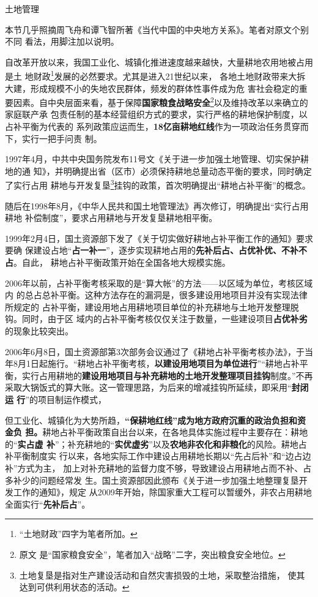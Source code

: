 土地管理

本节几乎照摘周飞舟和谭飞智所著《当代中国的中央地方关系》。笔者对原文个别不同
看法，用脚注加以说明。

自改革开放以来，我国工业化、城镇化推进速度越来越快，大量耕地农用地被占用是土
地财政\footnote{“土地财政”四字为笔者所加。}发展的必然要求。尤其是进入21世纪以来，
各地土地财政带来大拆大建，形成规模不小的失地农民群体，频发的群体性事件成为危
害社会稳定的重要因素。自中央层面来看，基于保障\textbf{国家粮食战略安全}\footnote{原文
  是“国家粮食安全”，笔者加入“战略”二字，突出粮食安全地位。}以及维持改革以来确立的家庭联产承
包责任制的基本经营组织方式的要求，实行严格的耕地保护制度，以占补平衡为代表的
系列政策应运而生，\textbf{18亿亩耕地红线}作为一项政治任务贯穿而下，实行一把手问责
制。

1997年4月，中共中央国务院发布11号文《关于进一步加强土地管理、切实保护耕地的通
知》，并明确提出省（区市）必须保持耕地总量动态平衡的要求，同时确定了实行占用
耕地与开发复垦\footnote{土地复垦是指对生产建设活动和自然灾害损毁的土地，采取整治措施，
  使其达到可供利用状态的活动。}挂钩的政策，首次明确提出“耕地占补平衡”的概念。

随后在1998年8月，《中华人民共和国土地管理法》再次修订，明确提出“实行占用耕地
补偿制度”，要求占用耕地与开发复垦耕地相平衡。

1999年2月4日，国土资源部下发了《关于切实做好耕地占补平衡工作的通知》要求要确
保建设占地“\textbf{占一补一}”，逐步实现耕地占用的\textbf{先补后占、占优补优、不补不占}。自此，
耕地占补平衡政策开始在全国各地大规模实施。

2006年以前，占补平衡考核采取的是“算大帐”的方法——以区域为单位，考核区域内
的总占总补平衡。这种方法存在的漏洞是，很多建设用地项目并没有实现法律所规定的
占补平衡，建设用地占用耕地项目单位的补充耕地与土地开发整理脱钩。同时，由于区
域内的占补平衡考核仅仅关注于数量，一些建设项目\textbf{占优补劣}的现象比较突出。

2006年6月8日，国土资源部第3次部务会议通过了《耕地占补平衡考核办法》，于当
年8月1日起施行。“耕地占补平衡考核，\textbf{以建设用地项目为单位进行}”“耕地占补平
衡，实行占用耕地的\textbf{建设用地项目与补充耕地的土地开发整理项目挂钩}制度。”不再
采取大锅饭式的算大账。这一管理思路，为后来的增减挂钩所延续，即采用“\textbf{封闭运
  行}”的项目制运作模式，

但工业化、城镇化为大势所趋，\textbf{“保耕地红线”成为地方政府沉重的政治负担和资金负
担。}耕地占补平衡政策自出台以来，在各地具体实施过程中主要存在：耕地的“\textbf{实占虚
补}”；补充耕地的“\textbf{实优虚劣}”以及\textbf{农地非农化和非粮化}的风险。耕地占补平衡制度实
行以来，各地实际工作中建设占用耕地长期以“先占后补”和“边占边补”方式为主，
加上对补充耕地的监督力度不够，导致建设占用耕地占而不补、占多补少的问题经常发
生。国土资源部因此颁布《关于进一步加强土地整理复垦开发工作的通知》，规定
从2009年开始，除国家重大工程可以暂缓外，非农占用耕地全面实行“\textbf{先补后占}”。

